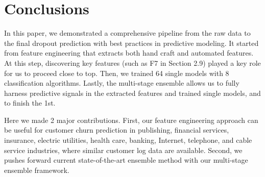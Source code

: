 \section{Conclusions}
In this paper, we demonstrated a comprehensive pipeline from the raw data to the final dropout prediction with best practices in  predictive modeling.  It started from feature engineering that extracts both hand craft and automated features.  At this step, discovering key features (such as F7 in Section 2.9) played a key role for us to proceed close to top. Then, we trained 64 single models with 8 classification algorithms. Lastly, the multi-stage ensemble allows us to fully harness predictive signals in the extracted features and trained single models, and to finish the 1st.

Here we made 2 major contributions.  First, our feature engineering approach can be useful for customer churn prediction in publishing, financial services, insurance, electric utilities, health care, banking, Internet, telephone, and cable service industries, where similar customer log data are available.  Second, we pushes forward current state-of-the-art ensemble method with our multi-stage ensemble framework.